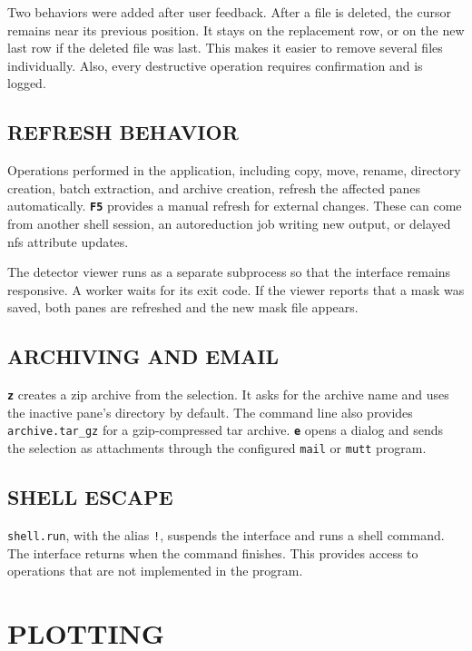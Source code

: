 \documentclass[tm]{ornltm}
\newcommand{\cmd}[1]{\texttt{#1}}
\newcommand{\key}[1]{\textbf{\texttt{#1}}}
\begin{document}
Two behaviors were added after user feedback. After a file is deleted, the
cursor remains near its previous position. It stays on the replacement row, or
on the new last row if the deleted file was last. This makes it easier to remove
several files individually. Also, every destructive operation requires
confirmation and is logged.

\subsection{REFRESH BEHAVIOR}

Operations performed in the application, including copy, move, rename, directory
creation, batch extraction, and archive creation, refresh the affected panes
automatically. \key{F5} provides a manual refresh for external changes. These
can come from another shell session, an autoreduction job writing new output, or
delayed \ac{nfs} attribute updates.

The detector viewer runs as a separate subprocess so that the interface remains
responsive. A worker waits for its exit code. If the viewer reports that a mask
was saved, both panes are refreshed and the new mask file appears.

\subsection{ARCHIVING AND EMAIL}

\key{z} creates a zip archive from the selection. It asks for the archive name
and uses the inactive pane's directory by default. The command line also provides
\cmd{archive.tar\_gz} for a gzip-compressed tar archive. \key{e} opens a dialog
and sends the selection as attachments through the configured \texttt{mail} or
\texttt{mutt} program.

\subsection{SHELL ESCAPE}

\cmd{shell.run}, with the alias \texttt{!}, suspends the interface and runs a
shell command. The interface returns when the command finishes. This provides
access to operations that are not implemented in the program.

\section{PLOTTING}
\label{sec:plot}
\end{document}
